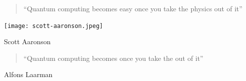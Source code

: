 %
%
%
%
%
%
%
%
%
%
%





\begin{frame}
\vfill


\Large

\begin{quote}
``Quantum computing becomes easy once you take the physics out of it''
\end{quote}
\hfill
\texttt{[image: scott-aaronson.jpeg]}

\hfill Scott Aaronson

\pause

\vfill

\begin{quote}
``Quantum computing becomes  once you take the  out of it''
\end{quote}
\hfill Alfons Laarman


\end{frame}




